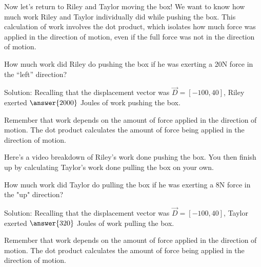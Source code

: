 \documentclass{ximera}
\begin{document}
Now let's return to Riley and Taylor moving the box! We want to know how much work Riley and Taylor individually did while pushing the box. This calculation of work involves the dot product, which isolates how much force was applied in the direction of motion, even if the full force was not in the direction of motion.

\begin{problem}
    How much work did Riley do pushing the box if he was exerting a 20N force in the ``left'' direction?

    Solution: Recalling that the displacement vector was $\vec{D}=[-100,40]$, Riley exerted $\answer{2000}$ Joules of work pushing the box.

    \begin{feedback}
        Remember that work depends on the amount of force applied in the direction of motion. The dot product calculates the amount of force being applied in the direction of motion.
    \end{feedback}
\end{problem}

Here's a video breakdown of Riley's work done pushing the box. You then finish up by calculating Taylor's work done pulling the box on your own.

\begin{center}
\end{center}

\begin{problem}
    How much work did Taylor do pulling the box if he was exerting a 8N force in the "up" direction?

    Solution: Recalling that the displacement vector was $\vec{D}=[-100,40]$, Taylor exerted $\answer{320}$ Joules of work pulling the box.

        \begin{feedback}
        Remember that work depends on the amount of force applied in the direction of motion. The dot product calculates the amount of force being applied in the direction of motion.
    \end{feedback}
\end{problem}
\end{document}
